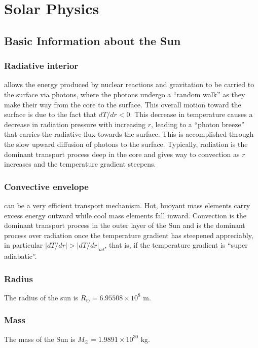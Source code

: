 \chapter{Solar Physics}

\section{Basic Information about the Sun}
\citep[see][]{carroll_introduction_2007}

	\subsection{Radiative interior}
	 allows the energy produced by nuclear reactions and gravitation to be carried to the surface via photons, where the photons undergo a ``random walk'' as they make their way from the core to the surface. This overall motion toward the surface is due to the fact that $dT/dr<0$. This decrease in temperature causes a decrease in radiation pressure with increasing $r$, leading to a ``photon breeze'' that carries the radiative flux towards the surface. This is accomplished through the slow upward diffusion of photons to the surface. Typically, radiation is the dominant transport process deep in the core and gives way to convection as $r$ increases and the temperature gradient steepens.
	
	\subsection{Convective envelope}
	 can be a very efficient transport mechanism. Hot, buoyant mass elements carry excess energy outward while cool mass elements fall inward. Convection is the dominant transport process in the outer layer of the Sun and is the dominant process over radiation once the temperature gradient has steepened appreciably, in particular $\left|dT/dr\right|>\left|dT/dr\right|_{ad}$, that is, if the temperature gradient is ``super adiabatic''. 
	
	\subsection{Radius}
	The radius of the sun is $R_{\odot} = 6.95508\times10^8$ m.
	
	\subsection{Mass}
	The mass of the Sun is $M_{\odot} = 1.9891\times10^{30}$ kg.
	
